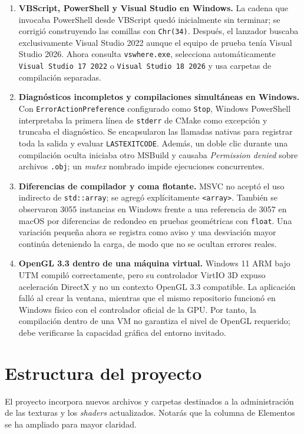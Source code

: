 \documentclass[letter,11pt]{article}
\begin{document}
\begin{enumerate}[leftmargin=*]
		\item \textbf{VBScript, PowerShell y Visual Studio en Windows.}
		La cadena que invocaba PowerShell desde VBScript quedó inicialmente sin terminar; se corrigió construyendo las comillas con \texttt{Chr(34)}. Después, el lanzador buscaba exclusivamente Visual Studio 2022 aunque el equipo de prueba tenía Visual Studio 2026. Ahora consulta \texttt{vswhere.exe}, selecciona automáticamente \texttt{Visual Studio 17 2022} o \texttt{Visual Studio 18 2026} y usa carpetas de compilación separadas.

		\item \textbf{Diagnósticos incompletos y compilaciones simultáneas en Windows.}
		Con \texttt{ErrorActionPreference} configurado como \texttt{Stop}, Windows PowerShell interpretaba la primera línea de \texttt{stderr} de CMake como excepción y truncaba el diagnóstico. Se encapsularon las llamadas nativas para registrar toda la salida y evaluar \texttt{LASTEXITCODE}. Además, un doble clic durante una compilación oculta iniciaba otro MSBuild y causaba \textit{Permission denied} sobre archivos \texttt{.obj}; un \textit{mutex} nombrado impide ejecuciones concurrentes.

		\item \textbf{Diferencias de compilador y coma flotante.}
		MSVC no aceptó el uso indirecto de \texttt{std::array}; se agregó explícitamente \texttt{<array>}. También se observaron 3055 instancias en Windows frente a una referencia de 3057 en macOS por diferencias de redondeo en pruebas geométricas con \texttt{float}. Una variación pequeña ahora se registra como aviso y una desviación mayor continúa deteniendo la carga, de modo que no se ocultan errores reales.

		\item \textbf{OpenGL 3.3 dentro de una máquina virtual.}
		Windows 11 ARM bajo UTM compiló correctamente, pero su controlador VirtIO 3D expuso aceleración DirectX y no un contexto OpenGL 3.3 compatible. La aplicación falló al crear la ventana, mientras que el mismo repositorio funcionó en Windows físico con el controlador oficial de la GPU. Por tanto, la compilación dentro de una VM no garantiza el nivel de OpenGL requerido; debe verificarse la capacidad gráfica del entorno invitado.
	\end{enumerate}
	
	\section{Estructura del proyecto}
	El proyecto incorpora nuevos archivos y carpetas destinados a la administración de las texturas y los \textit{shaders} actualizados. Notarás que la columna de Elementos se ha ampliado para mayor claridad.
	
\end{document}
